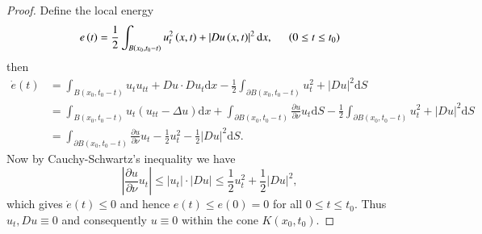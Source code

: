 \begin{proof}
Define the local energy 
$$
e\left( t \right) =\frac{1}{2}\int_{B\left( x_0,t_0-t \right)}{u_{t}^{2}\left( x,t \right) +\left| Du\left( x,t \right) \right|^2\mathrm{d}x},\hspace{0.5cm}\left( 0\le t\le t_0 \right) 
$$
then 
$$
\begin{aligned}
\dot{e}\left( t \right) &=\int_{B\left( x_0,t_0-t \right)}{u_tu_{tt}+Du\cdot Du_t\mathrm{d}x}-\frac{1}{2}\int_{\partial B\left( x_0,t_0-t \right)}{u_{t}^{2}+\left| Du \right|^2\mathrm{d}S}
\\
&=\int_{B\left( x_0,t_0-t \right)}{u_t\left( u_{tt}-\Delta u \right) \mathrm{d}x}+\int_{\partial B\left( x_0,t_0-t \right)}{\frac{\partial u}{\partial \nu}u_t\mathrm{d}S}-\frac{1}{2}\int_{\partial B\left( x_0,t_0-t \right)}{u_{t}^{2}+\left| Du \right|^2\mathrm{d}S}
\\
&=\int_{\partial B\left( x_0,t_0-t \right)}{\frac{\partial u}{\partial \nu}u_t-\frac{1}{2}u_{t}^{2}-\frac{1}{2}\left| Du \right|^2\mathrm{d}S}.
\end{aligned}
$$
Now by Cauchy-Schwartz's inequality we have 
$$
\left| \frac{\partial u}{\partial \nu}u_t \right|\le \left| u_t \right|\cdot \left| Du \right|\le \frac{1}{2}u_{t}^{2}+\frac{1}{2}\left| Du \right|^2,
$$
which gives $\dot{e}(t)\le 0$ and hence $e(t)\le e(0)=0$ for all $0\le t\le t_0$. Thus $u_t,Du\equiv 0$ and consequently $u\equiv 0$ within the cone $K(x_0,t_0)$.
\end{proof}